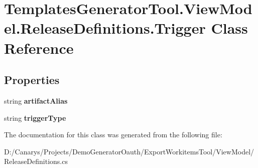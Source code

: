 \hypertarget{class_templates_generator_tool_1_1_view_model_1_1_release_definitions_1_1_trigger}{}\section{Templates\+Generator\+Tool.\+View\+Model.\+Release\+Definitions.\+Trigger Class Reference}
\label{class_templates_generator_tool_1_1_view_model_1_1_release_definitions_1_1_trigger}
\subsection*{Properties}
\begin{DoxyCompactItemize}
\item 
\mbox{\label{class_templates_generator_tool_1_1_view_model_1_1_release_definitions_1_1_trigger_a8bdef2f98892ee8510e0cb31462e1982}} 
string {\bfseries artifact\+Alias}
\item 
\mbox{\label{class_templates_generator_tool_1_1_view_model_1_1_release_definitions_1_1_trigger_ac719487b4de80ead00917417f29cee40}} 
string {\bfseries trigger\+Type}
\end{DoxyCompactItemize}


The documentation for this class was generated from the following file\+:\begin{DoxyCompactItemize}
\item 
D\+:/\+Canarys/\+Projects/\+Demo\+Generator\+Oauth/\+Export\+Workitems\+Tool/\+View\+Model/Release\+Definitions.\+cs\end{DoxyCompactItemize}
